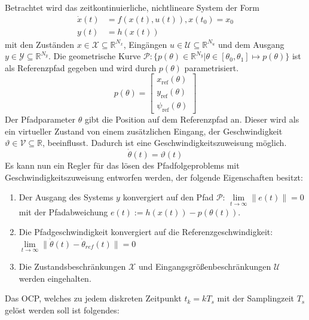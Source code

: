 \noindent Betrachtet wird das zeitkontinuierliche, nichtlineare System der Form 
\begin{align}
    \dot{x}(t)  &= f(x(t),u(t)), x(t_0)= x_0\\
    y(t)        &= h(x(t)) 
\end{align}
mit den Zuständen $x\in\mathcal{X}\subseteq\mathbb{R}^{N_x}$, Eingängen $u\in\mathcal{U}\subseteq\mathbb{R}^{N_u}$ und dem Ausgang \linebreak $y\in\mathcal{Y}\subseteq\mathbb{R}^{N_y}$. Die geometrische Kurve $\mathcal{P}:\{p(\theta)\in\mathbb{R}^{N_y}|\theta\in[\theta_0,\theta_1]\mapsto p(\theta)\}$ ist als Referenzpfad gegeben und wird durch $p(\theta)$ parametrisiert.
\begin{equation}
    p(\theta) = 
    \begin{bmatrix}
        x_{\text{ref}}(\theta) \\
        y_{\text{ref}}(\theta) \\
        \psi_{\text{ref}}(\theta)
    \end{bmatrix}    
\end{equation}
Der Pfadparameter $\theta$ gibt die Position auf dem Referenzpfad an. Dieser wird als ein virtueller Zustand von einem zusätzlichen Eingang, der Geschwindigkeit $\vartheta\in\mathcal{V}\subseteq\mathbb{R}$, beeinflusst. Dadurch ist eine Geschwindigkeitszuweisung möglich.
\begin{equation}
    \dot{\theta}(t)=\vartheta(t)
\end{equation}
\noindent Es kann nun ein Regler für das lösen des Pfadfolgeproblems mit Geschwindigkeitszuweisung entworfen werden, der folgende Eigenschaften besitzt:
\begin{enumerate}
    \item Der Ausgang des Systems $y$ konvergiert auf den Pfad $\mathcal{P}$: $\lim \limits_{t \to \infty} \|e(t)\| = 0$ mit der Pfadabweichung $e(t) := h(x(t)) - p(\theta(t))$.
    \item Die Pfadgeschwindigkeit konvergiert auf die Referenzgeschwindigkeit: $\lim \limits_{t \to \infty} \|\dot{\theta}(t)-\dot{\theta}_{ref}(t)\| = 0$
    \item Die Zustandsbeschränkungen $\mathcal{X}$ und Eingangsgrößenbeschränkungen $\mathcal{U}$ werden eingehalten.
\end{enumerate}
\medskip
\noindent Das OCP, welches zu jedem diskreten Zeitpunkt $t_k=kT_s$ mit der Samplingzeit $T_s$ gelöst werden soll ist folgendes:
